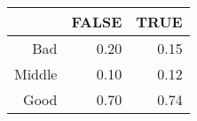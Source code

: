 \begin{table}[ht]
\centering
\begin{tabular}{rrr}
  \hline
 & FALSE & TRUE \\ 
  \hline
Bad & 0.20 & 0.15 \\ 
  Middle & 0.10 & 0.12 \\ 
  Good & 0.70 & 0.74 \\ 
   \hline
\end{tabular}
\end{table}

